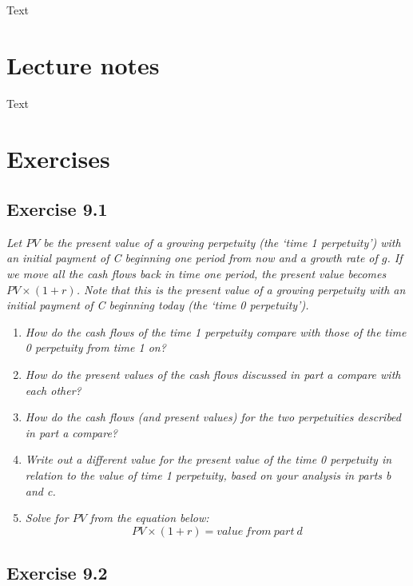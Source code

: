 \documentclass[]{book}
\theoremstyle{definition}
\theoremstyle{definition}
\theoremstyle{remark}
\begin{document}
Text

\section{Lecture notes}\label{lecture-notes-8}

Text

\section{Exercises}\label{exercises-8}

\subsection{Exercise 9.1}\label{exercise-9.1}

\emph{Let \(PV\) be the present value of a growing perpetuity (the `time
1 perpetuity') with an initial payment of C beginning one period from
now and a growth rate of \(g\). If we move all the cash flows back in
time one period, the present value becomes \(PV\times\left(1+r\right)\).
Note that this is the present value of a growing perpetuity with an
initial payment of C beginning today (the `time 0 perpetuity').}
\citep[p.306]{book}

\begin{enumerate}
\def\labelenumi{\alph{enumi}.}
\item
  \emph{How do the cash flows of the time 1 perpetuity compare with
  those of the time 0 perpetuity from time 1 on?} \citep[p.306]{book}
\item
  \emph{How do the present values of the cash flows discussed in part a
  compare with each other?} \citep[p.306]{book}
\item
  \emph{How do the cash flows (and present values) for the two
  perpetuities described in part a compare?} \citep[p.306]{book}
\item
  \emph{Write out a different value for the present value of the time 0
  perpetuity in relation to the value of time 1 perpetuity, based on
  your analysis in parts b and c.} \citep[p.306]{book}
\item
  \emph{Solve for \(PV\) from the equation below:} \citep[p.306]{book}
  \[PV\times\left(1+r\right)=value \ from  \ part \ d\]
\end{enumerate}

\subsection{Exercise 9.2}\label{exercise-9.2}
\end{document}
